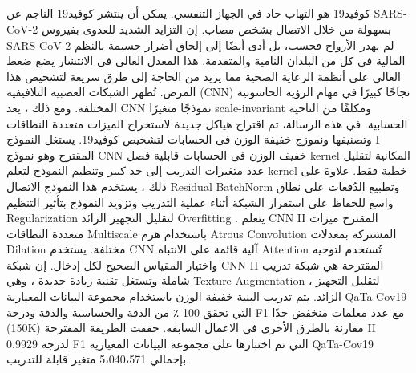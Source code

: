 \begin{arab}[utf]
    \chapter*{} %
    \label{araSummery} 
    
        كوفيد19 هو التهاب حاد في الجهاز التنفسي. يمكن أن ينتشر كوفيد19 الناجم عن SARS-CoV-2 بسهولة من خلال الاتصال بشخص مصاب. إن التزايد الشديد للعدوى بفيروس SARS-CoV-2 لم يهدر الأرواح فحسب، بل أدى أيضًا إلى إلحاق أضرار جسيمة بالنظم المالية في كل من البلدان النامية والمتقدمة. هذا  المعدل العالى فى الانتشار يضع ضغط العالي على أنظمة الرعاية الصحية مما يزيد من الحاجة إلى طرق سريعة لتشخيص هذا المرض. تُظهر الشبكات العصبية التلافيفية (CNN) نجاحًا كبيرًا في مهام الرؤية الحاسوبية المختلفة. ومع ذلك ، يعد CNN نموذجًا متغيرًا scale-invariant ومكلفًا من الناحية الحسابية. في هذه الرسالة، تم اقتراح هياكل جديدة لاستخراج الميزات متعددة النطاقات وتصنيفها ونموزج خفيفة الوزن فى الحسابات لتشخيص كوفيد19. يستغل النموذج I المقترح وهو نموذج CNN خفيف الوزن فى الحسابات قابلية فصل kernel المكانية لتقليل عدد متغيرات التدريب إلى حد كبير وتنظيم النموذج لتعلم kernel خطية فقط. علاوة على ذلك ، يستخدم هذا النموذج الاتصال Residual BatchNorm وتطبيع الدُفعات على نطاق واسع للحفاظ على استقرار الشبكة أثناء عملية التدريب وتزويد النموذج بتأثير التنظيم Regularization لتقليل التجهيز الزائد Overfitting . يتعلم CNN II المقترح ميزات متعددة النطاقات Multiscale  باستخدام هرم Atrous Convolution المشتركة بمعدلات Dilation مختلفة. يستخدم  CNN  آلية قائمة على الانتباه Attention تُستخدم لتوجيه واختيار المقياس الصحيح لكل إدخال. إن شبكة CNN II المقترحة هي شبكة تدريب شاملة وتستغل تقنية زيادة جديدة ، وهي Texture Augmentation ، لتقليل التجهيز الزائد. يتم تدريب البنية خفيفة الوزن باستخدام مجموعة البيانات المعيارية QaTa-Cov19 التي تحقق 100 ٪ من الدقة والحساسية والدقة ودرجة F1 مع عدد معلمات منخفض جدًا (150K) مقارنة بالطرق الأخرى في الاعمال السابقه. حققت الطريقة المقترحة II 0.9929 لدرجة F1 التي تم اختبارها على مجموعة البيانات المعيارية QaTa-Cov19 بإجمالي 5،040،571 متغير قابلة للتدريب.
    
    \end{arab}